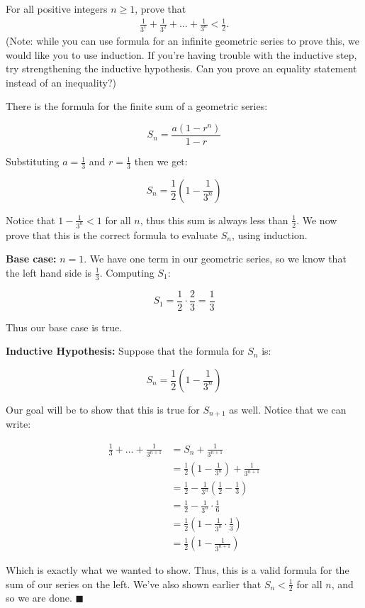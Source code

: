 \documentclass[11pt]{article}
\begin{document}
\pagebreak
{}

For all positive integers $n \ge 1$, prove that
\begin{align*}
	\frac{1}{3^1}+\frac{1}{3^2}+ \hdots +\frac{1}{3^n} < \frac{1}{2}.
\end{align*}
(Note: while you can use formula for an infinite geometric series to prove this, we would like you to use induction.  If you're having trouble with the inductive step, try strengthening the inductive hypothesis.  Can you prove an equality statement instead of an inequality?)

\begin{solution}
    There is the formula for the finite sum of a geometric series:

    \[ S_n = \frac{a(1 - r^n)}{1-r}\]

    Substituting $a = \frac{1}{3}$ and $r = \frac{1}{3}$ then we get:


    \[ S_n = \frac{1}{2}\left(1 - \frac{1}{3^n}\right)\] 

    Notice that $1 - \frac{1}{3^n} < 1$ for all $n$, thus this sum is always less than $\frac{1}{2}$. We now prove that this is the correct formula to evaluate $S_n$, using induction. 


    \textbf{Base case:} $n = 1$. We have one term in our geometric series, so we know that the left hand side is $\frac{1}{3}$. Computing $S_1$:

    \[ S_1 = \frac{1}{2} \cdot \frac{2}{3} = \frac{1}{3}\]

    Thus our base case is true. 


    \textbf{Inductive Hypothesis:} Suppose that the formula for $S_n$ is:

    \[ S_n = \frac{1}{2}\left(1 - \frac{1}{3^n}\right)\]

    Our goal will be to show that this is true for $S_{n+1}$ as well. Notice that we can write:

    \begin{align*}
      \frac{1}{3} + \dots + \frac{1}{3^{n+1}} &= S_n + \frac{1}{3^{n+1}}\\
      &= \frac{1}{2}\left(1 - \frac{1}{3^n}\right) + \frac{1}{3^{n+1}}\\
      &= \frac{1}{2} - \frac{1}{3^n}\left(\frac{1}{2} - \frac{1}{3}\right)\\
      &= \frac{1}{2} - \frac{1}{3^n} \cdot \frac{1}{6}\\
      &= \frac{1}{2}\left(1 - \frac{1}{3^n} \cdot \frac{1}{3}\right)\\
      &= \frac{1}{2}\left(1 - \frac{1}{3^{n+1}}\right)
    \end{align*}

    Which is exactly what we wanted to show. Thus, this is a valid formula for the sum of our series on the left. We've also shown earlier that $S_n < \frac{1}{2}$ for all $n$, and so we are done. $\blacksquare$


\end{solution}
\end{document}
